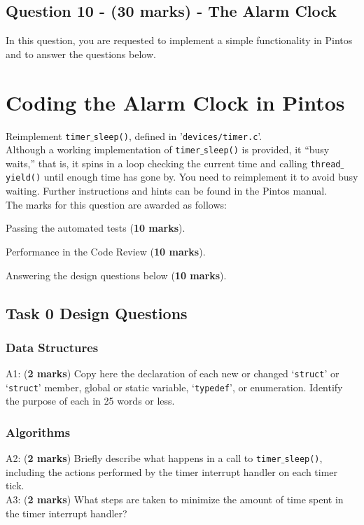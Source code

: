 \documentclass[a4paper,12pt]{article}
\begin{document}
\subsection*{Question 10 - (30 marks) - The Alarm Clock}
In this question, you are requested to implement a simple functionality in Pintos and to answer the questions below.

\section*{Coding the Alarm Clock in Pintos} 
Reimplement \texttt{timer$\_$sleep()}, defined in '\texttt{devices/timer.c}’.\\ 

\noindent Although a working implementation of \texttt{timer$\_$sleep()} is provided, it “busy waits,” that is, 
it spins in a loop checking the current time and calling \texttt{thread$\_$yield()} until enough time has gone by. 
You need to reimplement it to avoid busy waiting. 
Further instructions and hints can be found in the Pintos manual.\\

\noindent The marks for this question are awarded as follows:

Passing the automated tests ({\bf 10 marks}). 

Performance in the Code Review ({\bf 10 marks}). 

Answering the design questions below ({\bf 10 marks}).

\newpage
\subsection*{Task 0 Design Questions}

\subsubsection*{Data Structures}
A1: ({\bf 2 marks}) Copy here the declaration of each new or changed `\texttt{struct}' or `\texttt{struct}' member, global or static variable, `\texttt{typedef}', or enumeration. Identify the purpose of each in 25 words or less.

\subsubsection*{Algorithms}
A2: ({\bf 2 marks}) Briefly describe what happens in a call to \texttt{timer$\_$sleep()}, including the actions performed by the timer interrupt handler on each timer tick. \\ 
A3: ({\bf 2 marks}) What steps are taken to minimize the amount of time spent in the timer interrupt handler?
\end{document}
